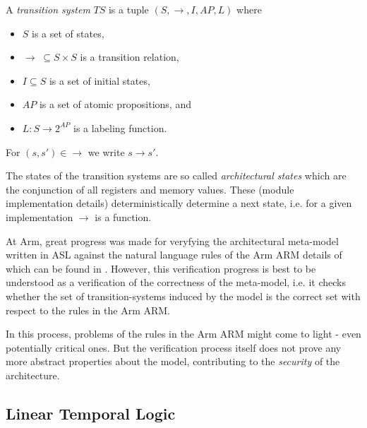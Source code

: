 \documentclass{securem}
\begin{document}
\begin{definition}
    A \textit{transition system} $ TS $ is a tuple $ (S, \rightarrow, I, AP, L) $ where

    \begin{itemize}
        \item $ S $ is a set of states,
        \item $ \rightarrow \; \subseteq S \times S $  is a transition relation,
        \item $ I \subseteq S $ is a set of initial states,
        \item $ AP $ is a set of atomic propositions, and
        \item $ L : S \rightarrow 2^{AP} $ is a labeling function.
    \end{itemize}

    For $ (s, s') \in \rightarrow $ we write $ s \rightarrow s' $.
\end{definition}

The states of the transition systems are so called \textit{architectural states} which are the conjunction of all registers and memory values.
These (module implementation details) deterministically determine a next state, i.e. for a given implementation $ \rightarrow $ is a function.


At Arm, great progress was made for veryfying the architectural meta-model written in ASL against the natural language rules of the Arm ARM details of which can be found in \cite{Reid17}.
However, this verification progress is best to be understood as a verification of the correctness of the meta-model, i.e. it checks whether the set of transition-systems induced by the model is the correct set with respect to the rules in the Arm ARM.

In this process, problems of the rules in the Arm ARM might come to light - even potentially critical ones.
But the verification process itself does not prove any more abstract properties about the model, contributing to the \textit{security} of the architecture.

\subsection{Linear Temporal Logic}
\end{document}
